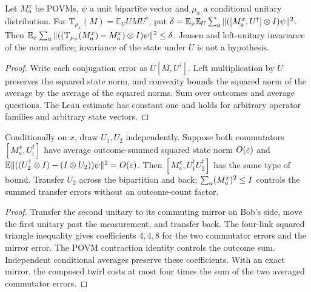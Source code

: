 \begin{lemma}
\label{lem:pauli-unitary-mixing}
\leanok
Let $M_a^x$ be POVMs, $\psi$ a unit bipartite vector and $\mu_x$ a
conditional unitary distribution. For
$\mathrm T_{\mu_x}(M)=\mathbb E_U UMU^\dagger$, put
$\delta=\mathbb E_x\mathbb E_U\sum_a
\|([M_a^x,U^\dagger]\otimes I)\psi\|^2$.
Then $\mathbb E_x\sum_a
\|((\mathrm T_{\mu_x}(M_a^x)-M_a^x)\otimes I)\psi\|^2\leq\delta$.
Jensen and left-unitary invariance of the norm suffice; invariance of the
state under $U$ is not a hypothesis.
\end{lemma}
\begin{proof}
\leanok
Write each conjugation error as $U[M,U^\dagger]$. Left multiplication by
$U$ preserves the squared state norm, and convexity bounds the squared
norm of the average by the average of the squared norms. Sum over outcomes
and average questions. The Lean estimate has constant one and holds for
arbitrary operator families and arbitrary state vectors.
\end{proof}

\begin{lemma}
\label{lem:pauli-two-sided-commutation}
\leanok
Conditionally on $x$, draw $U_1,U_2$ independently. Suppose both
commutators $[M_a^x,U_i^\dagger]$ have average outcome-summed squared state
norm $O(\varepsilon)$ and
$\mathbb E\|((U_2^\dagger\otimes I)-(I\otimes U_2))\psi\|^2=O(\varepsilon)$.
Then $[M_a^x,U_1^\dagger U_2^\dagger]$ has the same type of bound.
Transfer $U_2$ across the bipartition and back; $\sum_a(M_a^x)^2\leq I$
controls the summed transfer errors without an outcome-count factor.
\end{lemma}
\begin{proof}
\leanok
Transfer the second unitary to its commuting mirror on Bob's side, move
the first unitary past the measurement, and transfer back. The four-link
squared triangle inequality gives coefficients $4,4,8$ for the two
commutator errors and the mirror error. The POVM contraction identity
controls the outcome sum. Independent conditional averages preserve these
coefficients. With an exact mirror, the composed twirl costs at most four
times the sum of the two averaged commutator errors.
\end{proof}

